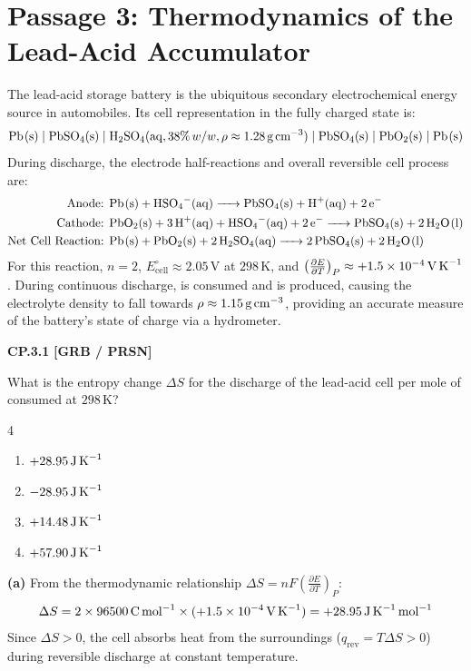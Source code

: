 \vspace{0.5cm}
\section*{Passage 3: Thermodynamics of the Lead-Acid Accumulator}

The lead-acid storage battery is the ubiquitous secondary electrochemical energy source in automobiles. Its cell representation in the fully charged state is:
\begin{equation*}
    \ce{Pb(s)} \mid \ce{PbSO4(s)} \mid \ce{H2SO4(aq, } 38\%\, w/w, \rho \approx 1.28\,\text{g\,cm}^{-3}\ce{)} \mid \ce{PbSO4(s)} \mid \ce{PbO2(s)} \mid \ce{Pb(s)}
\end{equation*}
During discharge, the electrode half-reactions and overall reversible cell process are:
\begin{align*}
    \text{Anode: } & \ce{Pb(s) + HSO4^-(aq) -> PbSO4(s) + H+(aq) + 2e^-} \\
    \text{Cathode: } & \ce{PbO2(s) + 3H+(aq) + HSO4^-(aq) + 2e^- -> PbSO4(s) + 2H2O(l)} \\
    \text{Net Cell Reaction: } & \ce{Pb(s) + PbO2(s) + 2H2SO4(aq) -> 2PbSO4(s) + 2H2O(l)}
\end{align*}
For this reaction, $n = 2$, $E^\circ_{\text{cell}} \approx 2.05\,\text{V}$ at $298\,\text{K}$, and $\left(\frac{\partial E}{\partial T}\right)_P \approx +1.5 \times 10^{-4}\,\text{V\,K}^{-1}$. During continuous discharge,  is consumed and  is produced, causing the electrolyte density to fall towards $\rho \approx 1.15\,\text{g\,cm}^{-3}$, providing an accurate measure of the battery's state of charge via a hydrometer.

\begin{problembox}
\textbf{CP.3.1} \hfill \textbf{[GRB / PRSN]}

What is the entropy change $\Delta S$ for the discharge of the lead-acid cell per mole of  consumed at $298\,\text{K}$?
\begin{multicols}{4}
\begin{enumerate}[label=(\alph*)]
    \item $+28.95\,\text{J\,K}^{-1}$
    \item $-28.95\,\text{J\,K}^{-1}$
    \item $+14.48\,\text{J\,K}^{-1}$
    \item $+57.90\,\text{J\,K}^{-1}$
\end{enumerate}
\end{multicols}
\end{problembox}
\begin{solution}
\textbf{(a)}
From the thermodynamic relationship $\Delta S = nF \left(\frac{\partial E}{\partial T}\right)_P$:
\begin{equation*}
    \Delta S = 2 \times 96500\,\text{C\,mol}^{-1} \times (+1.5 \times 10^{-4}\,\text{V\,K}^{-1}) = +28.95\,\text{J\,K}^{-1}\,\text{mol}^{-1}
\end{equation*}
Since $\Delta S > 0$, the cell absorbs heat from the surroundings ($q_{\text{rev}} = T\Delta S > 0$) during reversible discharge at constant temperature.
\end{solution}

